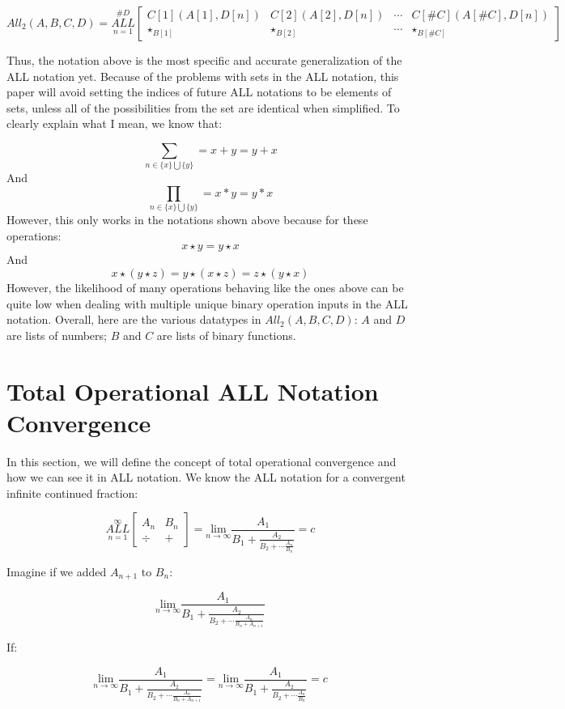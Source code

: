 \documentclass{article}
\begin{document}
$$All_2(A, B, C, D)=\underset{n=1}{\overset{\#D}{ALL}} \begin{bmatrix}
C[1](A[1],D[n]) & C[2](A[2],D[n]) & \cdots & C[\#C](A[\#C],D[n]) \\
\star_{B[1]}& \star_{B[2]} & \cdots & \star_{B[\#C]}
\end{bmatrix}$$

Thus, the notation above is the most specific and accurate generalization of the ALL notation yet. Because of the problems with sets in the ALL notation, this paper will avoid setting the indices of future ALL notations to be elements of sets, unless all of the possibilities from the set are identical when simplified. To clearly explain what I mean, we know that:

$$\underset{n \in \{ x \} \bigcup \{ y \} }{\sum} = x+y = y+x$$
And
$$\underset{n \in \{ x \} \bigcup \{ y \} }{\prod} = x*y = y*x$$
However, this only works in the notations shown above because for these operations:
$$x\star y = y \star x$$
And
$$x \star (y \star z) = y \star (x \star z) = z \star (y \star x)$$
However, the likelihood of many operations behaving like the ones above can be quite low when dealing with multiple unique binary operation inputs in the ALL notation. Overall, here are the various datatypes in $All_2(A,B,C,D)$: $A$ and $D$ are lists of numbers; $B$ and $C$ are lists of binary functions.

\section{Total Operational ALL Notation Convergence}

In this section, we will define the concept of total operational convergence and how we can see it in ALL notation. We know the ALL notation for a convergent infinite continued fraction:

$$\underset{n=1}{\overset{\infty}{ALL}} \begin{bmatrix}
A_n & B_n \\
\div & +
\end{bmatrix} = \underset{n \rightarrow \infty}{\text{lim}} \frac{A_1}{B_1+\frac{A_2}{B_2+\cdots\frac{A_n}{B_n}}}=c$$

Imagine if we added $A_{n+1}$ to $B_n$:

$$\underset{n \rightarrow \infty}{\text{lim}} \frac{A_1}{B_1+\frac{A_2}{B_2+\cdots\frac{A_n}{B_n+A_{n+1}}}}$$

If:

$$\underset{n \rightarrow \infty}{\text{lim}} \frac{A_1}{B_1+\frac{A_2}{B_2+\cdots\frac{A_n}{B_n+A_{n+1}}}}=\underset{n \rightarrow \infty}{\text{lim}} \frac{A_1}{B_1+\frac{A_2}{B_2+\cdots\frac{A_n}{B_n}}}=c$$
\end{document}

